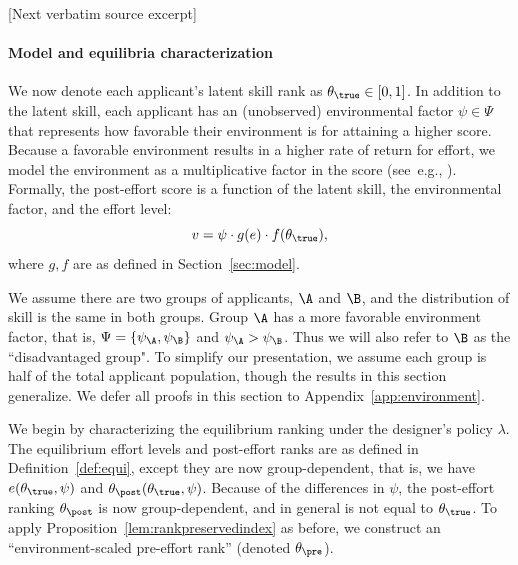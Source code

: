 \documentclass[10pt]{article}
\begin{document}
\begin{ReviewVerbatim}
{[Next verbatim source excerpt]

\paragraph{Model and equilibria characterization} We now denote each applicant's latent skill rank as $\theta_\true \in [0,1]$. In addition to the latent skill, each applicant has an (unobserved) environmental factor $\psi \in \Psi$ that represents how favorable their environment is for attaining a higher score. Because a favorable environment results in a higher rate of return for effort, we model the environment as a multiplicative factor in the score (see~e.g., \citet{calsamiglia09decent}). Formally, the post-effort score is a function of the latent skill, the environmental factor, and the effort level:
\begin{equation*}\label{eq:env-score}
v = \psi \cdot  g(e)\cdot f(\theta_\true),
\end{equation*}
where $g, f$ are as defined in Section~\ref{sec:model}. %


 We assume there are two groups of applicants, $\A$ and $\B$, and the distribution of skill is the same in both groups. Group $\A$ has a more favorable environment factor, that is,  $\Psi = \{\psi_\A, \psi_\B\}$ and $\psi_\A > \psi_\B$. Thus we will also refer to $\B$ as the ``disadvantaged group". To simplify our presentation, we assume each group is half of the total applicant population, though the results in this section generalize.%
%
We defer all proofs in this section to Appendix~\ref{app:environment}.

We begin by characterizing the equilibrium ranking under the designer's policy $\lambda$. The equilibrium effort levels and post-effort ranks are as defined in Definition~\ref{def:equi}, except they are now group-dependent, that is, we have $e(\theta_\true, \psi)$ and $\theta_\post(\theta_\true, \psi)$. Because of the differences in $\psi$, the post-effort ranking $\theta_\post$ is now group-dependent, and in general is not equal to $\theta_\true$. To apply Proposition~\ref{lem:rankpreservedindex} as before, we construct an ``environment-scaled pre-effort rank'' (denoted $\theta_\pre$).

}
\end{ReviewVerbatim}
\end{document}
